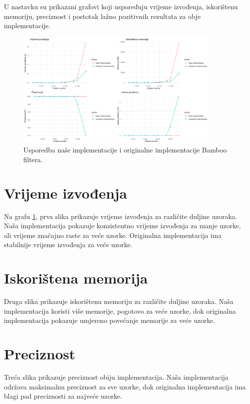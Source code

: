 \documentclass[seminarskirad]{fer}
\begin{document}
U nastavku su prikazani grafovi koji uspoređuju vrijeme izvođenja, iskorištenu memoriju, preciznost i postotak lažno pozitivnih rezultata za obje implementacije.

\begin{figure}[h]
	\centering
	\includegraphics[width=0.9\textwidth]{images/nasumicni_rezultati.png}
	\caption{Usporedba naše implementacije i originalne implementacije Bamboo filtera.}
	\label{fig:nasumicni_rezultati}
\end{figure}

\section{Vrijeme izvođenja}
Na grafu \ref{fig:nasumicni_rezultati}, prva slika prikazuje vrijeme izvođenja za različite duljine uzoraka. Naša implementacija pokazuje konzistentno vrijeme izvođenja za manje uzorke, ali vrijeme značajno raste za veće uzorke. Originalna implementacija ima stabilnije vrijeme izvođenja za veće uzorke.

\section{Iskorištena memorija}
Druga slika prikazuje iskorištenu memoriju za različite duljine uzoraka. Naša implementacija koristi više memorije, pogotovo za veće uzorke, dok originalna implementacija pokazuje umjereno povećanje memorije za veće uzorke.

\section{Preciznost}
Treća slika prikazuje preciznost obiju implementacija. Naša implementacija održava maksimalnu preciznost za sve uzorke, dok originalna implementacija ima blagi pad preciznosti za najveće uzorke.
\end{document}
